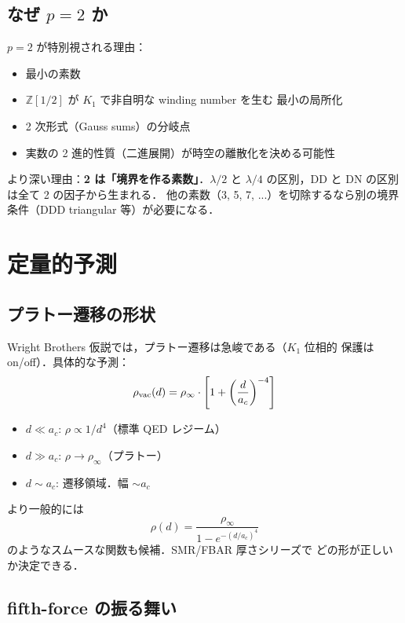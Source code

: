\documentclass[11pt,a4paper]{article}
\begin{document}
\subsection{なぜ $p=2$ か}

$p=2$ が特別視される理由：
\begin{itemize}
\item 最小の素数
\item $\mathbb Z[1/2]$ が $K_1$ で非自明な winding number を生む
最小の局所化
\item 2 次形式（Gauss sums）の分岐点
\item 実数の 2 進的性質（二進展開）が時空の離散化を決める可能性
\end{itemize}

より深い理由：\textbf{2 は「境界を作る素数」}．$\lambda/2$ と
$\lambda/4$ の区別，DD と DN の区別は全て 2 の因子から生まれる．
他の素数（3, 5, 7, ...）を切除するなら別の境界条件（DDD triangular
等）が必要になる．

\section{定量的予測}

\subsection{プラトー遷移の形状}

Wright Brothers 仮説では，プラトー遷移は急峻である（$K_1$ 位相的
保護は on/off）．具体的な予測：
\begin{equation}
\rho_{\rm vac}(d) = \rho_\infty \cdot \left[1 + \left(\frac{d}{a_c}\right)^{-4}\right]
\end{equation}
\begin{itemize}
\item $d \ll a_c$: $\rho \propto 1/d^4$（標準 QED レジーム）
\item $d \gg a_c$: $\rho \to \rho_\infty$（プラトー）
\item $d \sim a_c$: 遷移領域．幅 $\sim a_c$
\end{itemize}

より一般的には
\begin{equation}
\rho(d) = \frac{\rho_\infty}{1 - e^{-(d/a_c)^4}}
\end{equation}
のようなスムースな関数も候補．SMR/FBAR 厚さシリーズで
どの形が正しいか決定できる．

\subsection{fifth-force の振る舞い}
\end{document}
